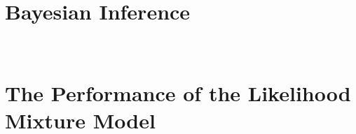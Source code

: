 \documentclass[a4paper,12pt ]{report}
\begin{document}


\clearpage

\appendix

\chapter{Bayesian Inference}



\clearpage

~~~

\clearpage

\chapter{The Performance of the Likelihood Mixture Model}



\singlespacing

\clearpage
~~~~
\clearpage


\end{document}
